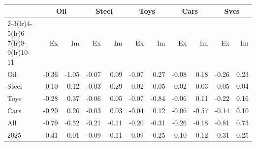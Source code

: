 \begin{tabular}{lrrrrrrrrrr}
\toprule
 & \multicolumn{2}{c}{Oil} & \multicolumn{2}{c}{Steel} & \multicolumn{2}{c}{Toys} & \multicolumn{2}{c}{Cars} & \multicolumn{2}{c}{Svcs} \\
\cmidrule(lr){2-3}\cmidrule(lr){4-5}\cmidrule(lr){6-7}\cmidrule(lr){8-9}\cmidrule(lr){10-11}
 & Ex & Im & Ex & Im & Ex & Im & Ex & Im & Ex & Im \\
\midrule
Oil & -0.36 & -1.05 & -0.07 & 0.09 & -0.07 & 0.27 & -0.08 & 0.18 & -0.26 & 0.23 \\
Steel & -0.10 & 0.12 & -0.03 & -0.29 & -0.02 & 0.05 & -0.02 & 0.03 & -0.05 & 0.04 \\
Toys & -0.28 & 0.37 & -0.06 & 0.05 & -0.07 & -0.84 & -0.06 & 0.11 & -0.22 & 0.16 \\
Cars & -0.20 & 0.26 & -0.03 & 0.03 & -0.04 & 0.12 & -0.06 & -0.57 & -0.14 & 0.10 \\
All & -0.79 & -0.52 & -0.21 & -0.11 & -0.20 & -0.31 & -0.26 & -0.18 & -0.81 & 0.73 \\
2025 & -0.41 & 0.01 & -0.09 & -0.11 & -0.09 & -0.25 & -0.10 & -0.12 & -0.31 & 0.25 \\
\bottomrule
\end{tabular}
